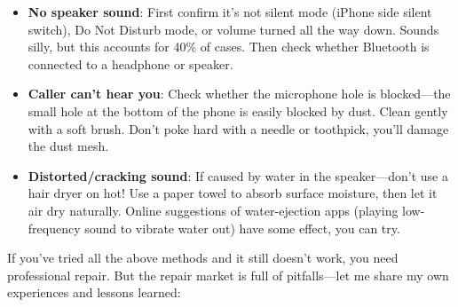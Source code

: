 
\begin{itemize}
  \item \textbf{No speaker sound}: First confirm it's not silent mode (iPhone side silent switch), Do Not Disturb mode, or volume turned all the way down. Sounds silly, but this accounts for 40\% of cases. Then check whether Bluetooth is connected to a headphone or speaker.
  \item \textbf{Caller can't hear you}: Check whether the microphone hole is blocked—the small hole at the bottom of the phone is easily blocked by dust. Clean gently with a soft brush. Don't poke hard with a needle or toothpick, you'll damage the dust mesh.
  \item \textbf{Distorted/cracking sound}: If caused by water in the speaker—don't use a hair dryer on hot! Use a paper towel to absorb surface moisture, then let it air dry naturally. Online suggestions of water-ejection apps (playing low-frequency sound to vibrate water out) have some effect, you can try.
\end{itemize}


If you've tried all the above methods and it still doesn't work, you need professional repair. But the repair market is full of pitfalls—let me share my own experiences and lessons learned:

